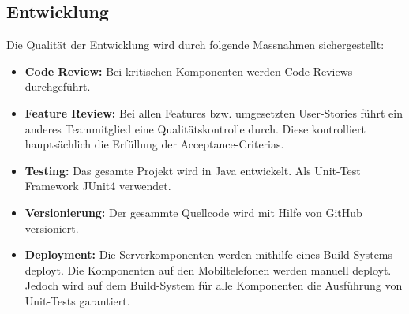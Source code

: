 \subsection{Entwicklung}
Die Qualität der Entwicklung wird durch folgende Massnahmen sichergestellt:
\begin{itemize}
	\item{\textbf{Code Review:} Bei kritischen Komponenten werden Code Reviews durchgeführt.}
	
	\item{\textbf{Feature Review:} Bei allen Features bzw. umgesetzten User-Stories führt ein anderes Teammitglied eine Qualitätskontrolle durch. Diese kontrolliert hauptsächlich die Erfüllung der Acceptance-Criterias.}
	
	\item{\textbf{Testing:} Das gesamte Projekt wird in Java entwickelt. Als Unit-Test Framework JUnit4 verwendet.}
	
	\item{\textbf{Versionierung:} Der gesammte Quellcode wird mit Hilfe von GitHub versioniert.}
	
	\item{\textbf{Deployment:} Die Serverkomponenten werden mithilfe eines Build Systems deployt. Die Komponenten auf den Mobiltelefonen werden manuell deployt. Jedoch wird auf dem Build-System für alle Komponenten die Ausführung von Unit-Tests garantiert.}
	
\end{itemize}

\newpage
